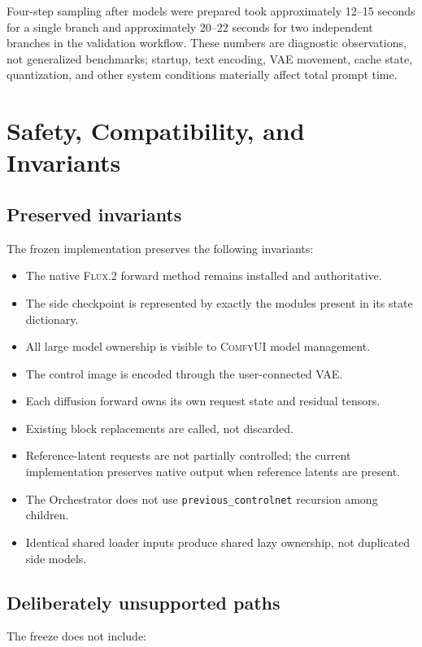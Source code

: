 \documentclass[11pt]{article}
\newcommand{\FluxTwo}{\textsc{Flux.2}}
\newcommand{\ComfyUI}{\textsc{ComfyUI}}
\newcommand{\code}[1]{\texttt{#1}}
\begin{document}
Four-step sampling after models were prepared took approximately 12--15 seconds for a single branch and approximately 20--22 seconds for two independent branches in the validation workflow. These numbers are diagnostic observations, not generalized benchmarks; startup, text encoding, VAE movement, cache state, quantization, and other system conditions materially affect total prompt time.

\section{Safety, Compatibility, and Invariants}

\subsection{Preserved invariants}

The frozen implementation preserves the following invariants:

\begin{itemize}
  \item The native \FluxTwo{} forward method remains installed and authoritative.
  \item The side checkpoint is represented by exactly the modules present in its state dictionary.
  \item All large model ownership is visible to \ComfyUI{} model management.
  \item The control image is encoded through the user-connected VAE.
  \item Each diffusion forward owns its own request state and residual tensors.
  \item Existing block replacements are called, not discarded.
  \item Reference-latent requests are not partially controlled; the current implementation preserves native output when reference latents are present.
  \item The Orchestrator does not use \code{previous\_controlnet} recursion among children.
  \item Identical shared loader inputs produce shared lazy ownership, not duplicated side models.
\end{itemize}

\subsection{Deliberately unsupported paths}

The freeze does not include:
\end{document}
